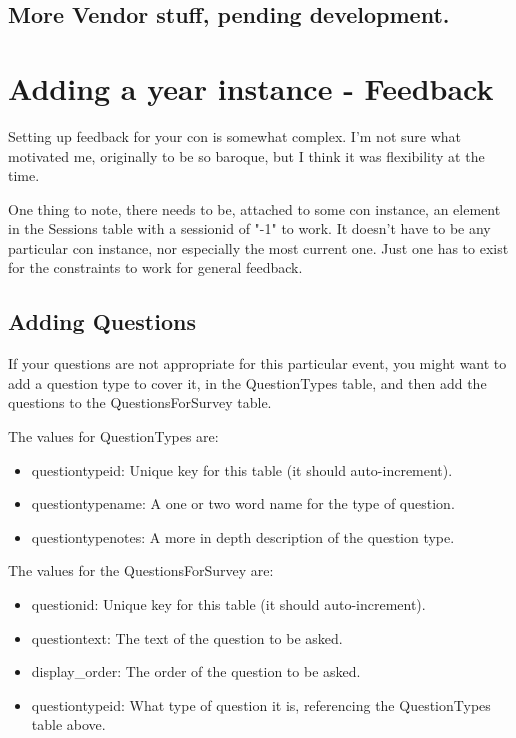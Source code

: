\documentclass[captions=tablesignature]{scrartcl}
\begin{document}
\subsection{More Vendor stuff, pending development.}
\label{sec-13-2}

\section{Adding a year instance - Feedback}
\label{sec-14}
Setting up feedback for your con is somewhat complex.  I'm not sure
what motivated me, originally to be so baroque, but I think it was
flexibility at the time.

One thing to note, there needs to be, attached to some con instance,
an element in the Sessions table with a sessionid of "-1" to work.
It doesn't have to be any particular con instance, nor especially
the most current one.  Just one has to exist for the constraints to
work for general feedback.
\subsection{Adding Questions}
\label{sec-14-1}
If your questions are not appropriate for this particular event,
you might want to add a question type to cover it, in the
QuestionTypes table, and then add the questions to the
QuestionsForSurvey table.

The values for QuestionTypes are:
\begin{itemize}
\item questiontypeid: Unique key for this table (it should auto-increment).
\item questiontypename: A one or two word name for the type of question.
\item questiontypenotes: A more in depth description of the question type.
\end{itemize}

The values for the QuestionsForSurvey are:
\begin{itemize}
\item questionid: Unique key for this table (it should auto-increment).
\item questiontext: The text of the question to be asked.
\item display\_order: The order of the question to be asked.
\item questiontypeid: What type of question it is, referencing the
QuestionTypes table above.
\end{itemize}
\end{document}
